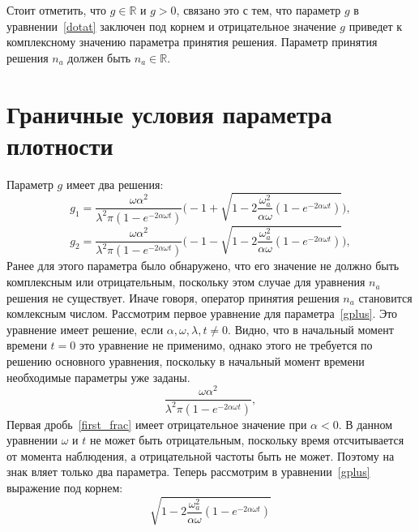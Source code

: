 Стоит отметить, что $g \in \mathbb{R}$ и $g > 0$, связано это с тем, что параметр $g$ в уравнении~\eqref{dotat}
заключен под корнем и отрицательное значение $g$ приведет к комплексному значению параметра принятия решения.
Параметр принятия решения $n_a$ должен быть $n_a \in \mathbb{R}$.

\section{Граничные условия параметра плотности}

Параметр $g$ имеет два решения:
\begin{equation}\label{gplus}
    g_{1} = \frac{\omega \alpha^{2}}{\lambda^{2} \pi (1-e^{-2 \alpha \omega t})}
    \Biggl( -1 + \sqrt{1 - 2 \frac{\omega^{2}_{a} }{\alpha \omega} (1-e^{-2 \alpha \omega t})} \Biggr),
\end{equation}
\begin{equation}\label{gminus}
    g_{2} = \frac{\omega \alpha^{2}}{\lambda^{2} \pi (1-e^{-2 \alpha \omega t})}
    \Biggl( -1 - \sqrt{1 - 2 \frac{\omega^{2}_{a} }{\alpha \omega} (1-e^{-2 \alpha \omega t})} \Biggr),
\end{equation}
Ранее для этого параметра было обнаружено, что его значение не должно быть комплексным или отрицательным,
поскольку этом случае для уравнения $n_{a}$ решения не существует.
Иначе говоря, оператор принятия решения $n_{a}$ становится комлексным числом.
Рассмотрим первое уравнение для параметра~\eqref{gplus}.
Это уравнение имеет решение, если $\alpha, \omega, \lambda, t \neq 0$.
Видно, что в начальный момент времени $t = 0$ это уравнение не применимо, однако этого не требуется
по решению основного уравнения, поскольку в начальный момент времени необходимые параметры уже заданы.
\begin{equation}\label{first_frac}
    \frac{\omega \alpha^{2}}{\lambda^{2} \pi (1-e^{-2 \alpha \omega t})},
\end{equation}
Первая дробь~\eqref{first_frac} имеет отрицательное значение при $\alpha < 0$.
В данном уравнении $\omega$ и $t$ не может быть отрицательным, поскольку время отсчитывается от
момента наблюдения, а отрицательной частоты быть не может.
Поэтому на знак вляет только два параметра.
Теперь рассмотрим в уравнении~\eqref{gplus} выражение под корнем:
\begin{equation}\label{last_square}
    \sqrt{1 - 2 \frac{\omega^{2}_{a} }{\alpha \omega} (1-e^{-2 \alpha \omega t})}
\end{equation}
